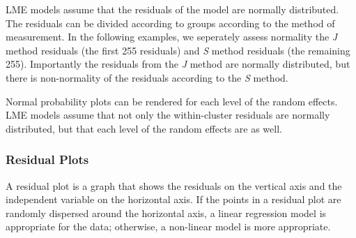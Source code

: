 \documentclass[12pt, a4paper]{report}
\theoremstyle{plain}
\theoremstyle{definition}
\theoremstyle{remark}
\begin{document}
	
	LME models assume that the residuals of the model are normally distributed.  The residuals can be divided according to groups according to the method of measurement. In the following examples, we seperately assess normality the \textit{J} method residuals (the first 255 residuals) and \textit{S} method residuals (the remaining 255). Importantly the residuals from the \textit{J} method are normally distributed, but there is non-normality of the residuals according to the \textit{S} method.
	
	
	
	Normal probability plots can be rendered for each level of the random effects.  LME models assume that not only the within-cluster residuals are normally distributed, but that each level of the random effects are as well. %
	
	
	
	
	
	
	
	
	
	
	
	
	
	
	
	
	
	\subsubsection{Residual Plots}
	A residual plot is a graph that shows the residuals on the vertical axis and the independent variable on the horizontal axis. If the points in a residual plot are randomly dispersed around the horizontal axis, a linear regression model is appropriate for the data; otherwise, a non-linear model is more appropriate.
	
\end{document}
